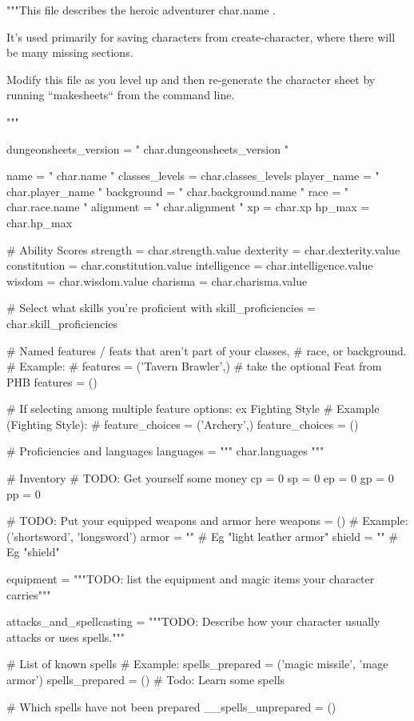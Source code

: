 """This file describes the heroic adventurer {{ char.name }}.

It's used primarily for saving characters from create-character,
where there will be many missing sections.

Modify this file as you level up and then re-generate the character
sheet by running ``makesheets`` from the command line.

"""

dungeonsheets_version = "{{ char.dungeonsheets_version }}"

name = "{{ char.name }}"
classes_levels = {{ char.classes_levels }}
player_name = "{{ char.player_name }}"
background = "{{ char.background.name }}"
race = "{{ char.race.name }}"
alignment = "{{ char.alignment }}"
xp = {{ char.xp }}
hp_max = {{ char.hp_max }}

# Ability Scores
strength = {{ char.strength.value }}
dexterity = {{ char.dexterity.value }}
constitution = {{ char.constitution.value }}
intelligence = {{ char.intelligence.value }}
wisdom = {{ char.wisdom.value }}
charisma = {{ char.charisma.value }}

# Select what skills you're proficient with
skill_proficiencies = {{ char.skill_proficiencies }}

# Named features / feats that aren't part of your classes,
# race, or background.
# Example:
# features = ('Tavern Brawler',)  # take the optional Feat from PHB
features = ()

# If selecting among multiple feature options: ex Fighting Style
# Example (Fighting Style):
# feature_choices = ('Archery',)
feature_choices = ()

# Proficiencies and languages
languages = """{{ char.languages }}"""

# Inventory
# TODO: Get yourself some money
cp = 0
sp = 0
ep = 0
gp = 0
pp = 0

# TODO: Put your equipped weapons and armor here
weapons = () # Example: ('shortsword', 'longsword')
armor = "" # Eg "light leather armor"
shield = "" # Eg "shield"

equipment = """TODO: list the equipment and magic items your character carries"""

attacks_and_spellcasting = """TODO: Describe how your character usually attacks
or uses spells."""

# List of known spells
# Example: spells_prepared = ('magic missile', 'mage armor')
spells_prepared = () # Todo: Learn some spells

# Which spells have not been prepared
__spells_unprepared = ()

